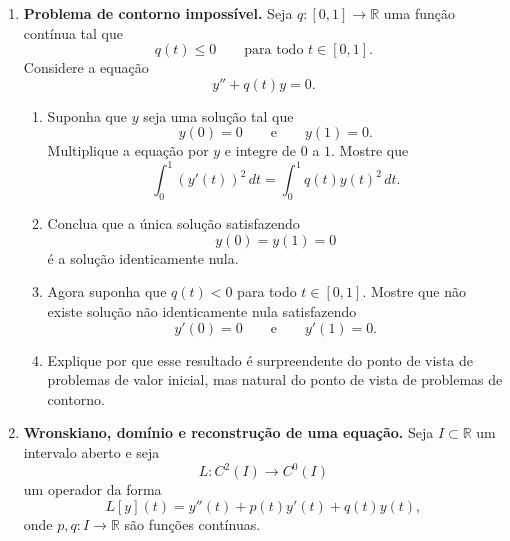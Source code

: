 \documentclass[a4paper,11pt,reqno]{amsart}
\begin{document}
\begin{enumerate}
\begin{enumerate}
    \item Dê um exemplo de duas funções $u,v\in C^2(\mathbb{R})$ linearmente independentes tais que
    \[
        W(u,v)(0)=0.
    \]

    \item Explique por que as funções do item anterior não podem ser duas soluções linearmente independentes de uma mesma equação
    \[
        y''+p(t)y'+q(t)y=0
    \]
    em todo $\mathbb{R}$, com $p,q$ contínuas.

    \item Discuta o que isso mostra sobre a diferença entre ``funções linearmente independentes'' e ``soluções linearmente independentes de uma mesma EDO linear homogênea''.
\end{enumerate}


\item \textbf{Problema de contorno impossível.}
Seja $q:[0,1]\to\mathbb{R}$ uma função contínua tal que
\[
    q(t)\leq 0
    \qquad\text{para todo }t\in[0,1].
\]
Considere a equação
\[
    y''+q(t)y=0.
\]

\begin{enumerate}
    \item Suponha que $y$ seja uma solução tal que
    \[
        y(0)=0
        \qquad\text{e}\qquad
        y(1)=0.
    \]
    Multiplique a equação por $y$ e integre de $0$ a $1$. Mostre que
    \[
        \int_0^1 (y'(t))^2\,dt
        =
        \int_0^1 q(t)y(t)^2\,dt.
    \]

    \item Conclua que a única solução satisfazendo
    \[
        y(0)=y(1)=0
    \]
    é a solução identicamente nula.

    \item Agora suponha que $q(t)<0$ para todo $t\in[0,1]$. Mostre que não existe solução não identicamente nula satisfazendo
    \[
        y'(0)=0
        \qquad\text{e}\qquad
        y'(1)=0.
    \]

    \item Explique por que esse resultado é surpreendente do ponto de vista de problemas de valor inicial, mas natural do ponto de vista de problemas de contorno.
\end{enumerate}


\item \textbf{Wronskiano, domínio e reconstrução de uma equação.}
Seja $I\subset\mathbb{R}$ um intervalo aberto e seja
\[
    L:C^2(I)\to C^0(I)
\]
um operador da forma
\[
    L[y](t)=y''(t)+p(t)y'(t)+q(t)y(t),
\]
onde $p,q:I\to\mathbb{R}$ são funções contínuas.


\end{enumerate}
\end{document}

